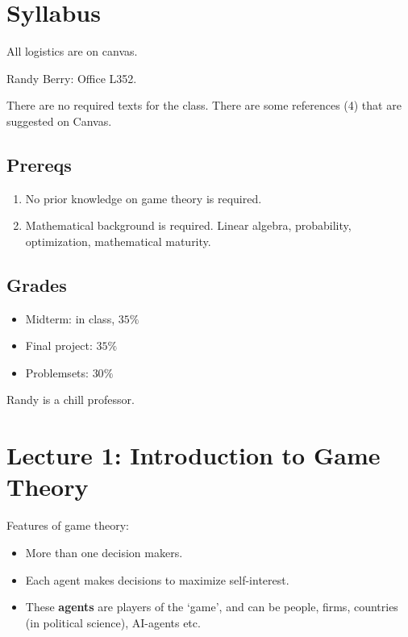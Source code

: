 \section{Syllabus}
\newsection
All logistics are on canvas.

Randy Berry: Office L352.

There are no required texts for the class. There are some references (4) that are suggested on Canvas. 
\subsection*{Prereqs}
\begin{enumerate}
    \item No prior knowledge on game theory is required.
    \item Mathematical background is required. Linear algebra, probability, optimization, mathematical maturity.
\end{enumerate}
\subsection*{Grades}
\begin{itemize}
    \item Midterm: in class, $35\%$
    \item Final project: $35\%$
    \item Problemsets: $30\%$
\end{itemize}
\begin{atheorem}{}{}
    Randy is a chill professor.
\end{atheorem}
\section{Lecture 1: Introduction to Game Theory}
\newsection
{}
Features of game theory:\begin{itemize}
    \item More than one decision makers.
    \item Each agent makes decisions to maximize self-interest.
    \item These \textbf{agents} are players of the `game', and can be people, firms, countries (in political science), AI-agents etc.
\end{itemize}


